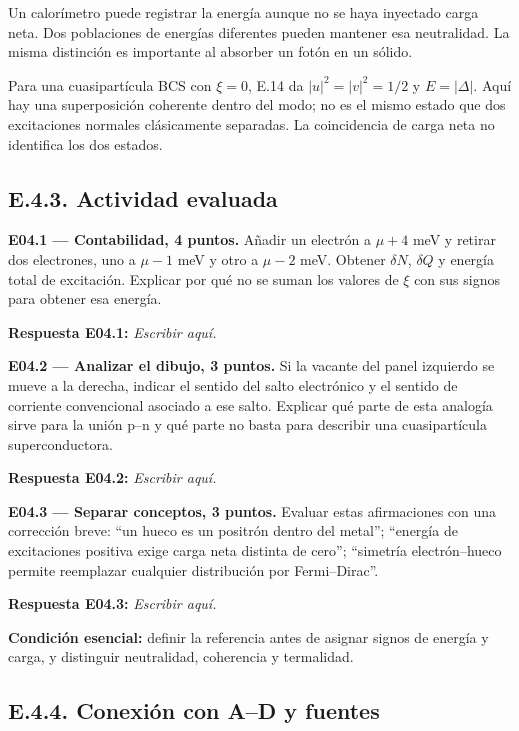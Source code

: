 \documentclass[
  spanish,
  10pt,
  a4paper,
]{article}
\begin{document}
Un calorímetro puede registrar la energía aunque no se haya inyectado
carga neta. Dos poblaciones de energías diferentes pueden mantener esa
neutralidad. La misma distinción es importante al absorber un fotón en
un sólido.

Para una cuasipartícula BCS con \(\xi=0\), E.14 da \(|u|^2=|v|^2=1/2\) y
\(E=|\Delta|\). Aquí hay una superposición coherente dentro del modo; no
es el mismo estado que dos excitaciones normales clásicamente separadas.
La coincidencia de carga neta no identifica los dos estados.

\subsection{E.4.3. Actividad evaluada}\label{e.4.3.-actividad-evaluada}

\textbf{E04.1 --- Contabilidad, 4 puntos.} Añadir un electrón a
\(\mu+4\) meV y retirar dos electrones, uno a \(\mu-1\) meV y otro a
\(\mu-2\) meV. Obtener \(\delta N\), \(\delta Q\) y energía total de
excitación. Explicar por qué no se suman los valores de \(\xi\) con sus
signos para obtener esa energía.

\textbf{Respuesta E04.1:} \emph{Escribir aquí.}

\textbf{E04.2 --- Analizar el dibujo, 3 puntos.} Si la vacante del panel
izquierdo se mueve a la derecha, indicar el sentido del salto
electrónico y el sentido de corriente convencional asociado a ese salto.
Explicar qué parte de esta analogía sirve para la unión p--n y qué parte
no basta para describir una cuasipartícula superconductora.

\textbf{Respuesta E04.2:} \emph{Escribir aquí.}

\textbf{E04.3 --- Separar conceptos, 3 puntos.} Evaluar estas
afirmaciones con una corrección breve: ``un hueco es un positrón dentro
del metal''; ``energía de excitaciones positiva exige carga neta
distinta de cero''; ``simetría electrón--hueco permite reemplazar
cualquier distribución por Fermi--Dirac''.

\textbf{Respuesta E04.3:} \emph{Escribir aquí.}

\textbf{Condición esencial:} definir la referencia antes de asignar
signos de energía y carga, y distinguir neutralidad, coherencia y
termalidad.

\subsection{E.4.4. Conexión con A--D y
fuentes}\label{e.4.4.-conexiuxf3n-con-ad-y-fuentes}
\end{document}
